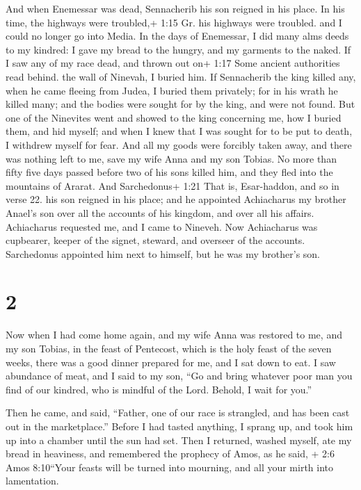  And when Enemessar was dead, Sennacherib his son reigned
in his place. In his time, the highways were troubled,+ 1:15 Gr. his
highways were troubled. and I could no longer go into Media.
 In the days of Enemessar, I did many alms deeds to my
kindred: I gave my bread to the hungry,  and my garments to
the naked. If I saw any of my race dead, and thrown out on+ 1:17 Some
ancient authorities read behind. the wall of Ninevah, I buried him.
 If Sennacherib the king killed any, when he came fleeing
from Judea, I buried them privately; for in his wrath he killed many;
and the bodies were sought for by the king, and were not found.
 But one of the Ninevites went and showed to the king
concerning me, how I buried them, and hid myself; and when I knew that I
was sought for to be put to death, I withdrew myself for fear.
 And all my goods were forcibly taken away, and there was
nothing left to me, save my wife Anna and my son Tobias. 
No more than fifty five days passed before two of his sons killed him,
and they fled into the mountains of Ararat. And Sarchedonus+ 1:21 That
is, Esar-haddon, and so in verse 22. his son reigned in his place; and
he appointed Achiacharus my brother Anael's son over all the accounts of
his kingdom, and over all his affairs.  Achiacharus
requested me, and I came to Nineveh. Now Achiacharus was cupbearer,
keeper of the signet, steward, and overseer of the accounts. Sarchedonus
appointed him next to himself, but he was my brother's son.

\hypertarget{section-1}{%
\section{2}\label{section-1}}

 Now when I had come home again, and my wife Anna was
restored to me, and my son Tobias, in the feast of Pentecost, which is
the holy feast of the seven weeks, there was a good dinner prepared for
me, and I sat down to eat.  I saw abundance of meat, and I
said to my son, ``Go and bring whatever poor man you find of our
kindred, who is mindful of the Lord. Behold, I wait for you.''

 Then he came, and said, ``Father, one of our race is
strangled, and has been cast out in the marketplace.'' 
Before I had tasted anything, I sprang up, and took him up into a
chamber until the sun had set.  Then I returned, washed
myself, ate my bread in heaviness,  and remembered the
prophecy of Amos, as he said, + 2:6 Amos 8:10``Your feasts will be
turned into mourning, and all your mirth into lamentation.

